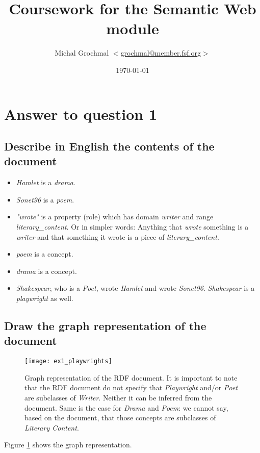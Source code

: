 \documentclass[a4paper,12pt]{article}
\title{Coursework for the Semantic Web module}
\author{Michal Grochmal
  $<$\href{mailto:grochmal@member.fsf.org}{grochmal@member.fsf.org}$>$
}
\date{\today}
\begin{document}
\VerbatimFootnotes
\maketitle

\section[Question 1]{Answer to question 1}
\subsection[Describe]{Describe in English the contents of the document}
\begin{itemize}
\item[]\emph{Hamlet} is a \emph{drama}.

\item[]\emph{Sonet96} is a \emph{poem}.

\item[]\emph{"wrote"} is a property (role) which has domain \emph{writer} and
range \emph{literary\_content}.  Or in simpler words: Anything that
\emph{wrote} something is a \emph{writer} and that something it wrote is a
piece of \emph{literary\_content}.

\item[]\emph{poem} is a concept.

\item[]\emph{drama} is a concept.

\item[]\emph{Shakespear}, who is a \emph{Poet}, wrote \emph{Hamlet} and wrote
\emph{Sonet96}.  \emph{Shakespear} is a \emph{playwright} as well.
\end{itemize}

\subsection[Draw]{Draw the graph representation of the document}
\begin{figure}[!htp]
\centering
\texttt{[image: ex1\_playwrights]}
\caption{Graph representation of the RDF document.  It is important to note
that the RDF document do \underline{not} specify that \emph{Playwright} and/or
\emph{Poet} are subclasses of \emph{Writer}.  Neither it can be inferred from
the document.  Same is the case for \emph{Drama} and \emph{Poem}: we cannot
say, based on the document, that those concepts are subclasses of
\emph{Literary Content}.}
\label{shakespear}
\end{figure}
Figure \ref{shakespear} shows the graph representation.
\end{document}
